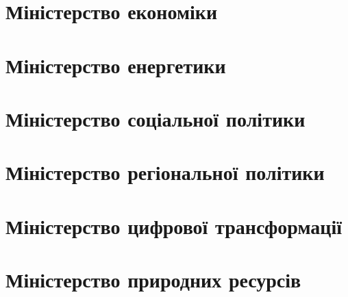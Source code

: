 \section{Міністерство економіки}

\section{Міністерство енергетики}

\section{Міністерство соціальної політики}

\section{Міністерство регіональної політики}

\section{Міністерство цифрової трансформації}

\section{Міністерство природних ресурсів}

